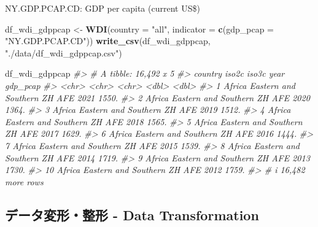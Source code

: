 \documentclass[
  xelatex, ja=standard]{bxjsbook}
\newenvironment{Shaded}{\begin{snugshade}}{\end{snugshade}}
\newcommand{\AttributeTok}[1]{\textcolor[rgb]{0.13,0.29,0.53}{#1}}
\newcommand{\CommentTok}[1]{\textcolor[rgb]{0.56,0.35,0.01}{\textit{#1}}}
\newcommand{\FunctionTok}[1]{\textcolor[rgb]{0.13,0.29,0.53}{\textbf{#1}}}
\newcommand{\NormalTok}[1]{#1}
\newcommand{\OtherTok}[1]{\textcolor[rgb]{0.56,0.35,0.01}{#1}}
\newcommand{\StringTok}[1]{\textcolor[rgb]{0.31,0.60,0.02}{#1}}
\theoremstyle{definition}
\theoremstyle{definition}
\theoremstyle{definition}
\theoremstyle{definition}
\theoremstyle{remark}
\begin{document}
NY.GDP.PCAP.CD: GDP per capita (current US\$)

\begin{Shaded}
\begin{Highlighting}[]
\NormalTok{df\_wdi\_gdppcap }\OtherTok{\textless{}{-}} \FunctionTok{WDI}\NormalTok{(}\AttributeTok{country =} \StringTok{"all"}\NormalTok{, }\AttributeTok{indicator =} \FunctionTok{c}\NormalTok{(}\AttributeTok{gdp\_pcap =} \StringTok{"NY.GDP.PCAP.CD"}\NormalTok{))}
\FunctionTok{write\_csv}\NormalTok{(df\_wdi\_gdppcap, }\StringTok{"./data/df\_wdi\_gdppcap.csv"}\NormalTok{)}
\end{Highlighting}
\end{Shaded}

\begin{Shaded}
\begin{Highlighting}[]
\NormalTok{df\_wdi\_gdppcap}
\CommentTok{\#\textgreater{} \# A tibble: 16,492 x 5}
\CommentTok{\#\textgreater{}    country                     iso2c iso3c  year gdp\_pcap}
\CommentTok{\#\textgreater{}    \textless{}chr\textgreater{}                       \textless{}chr\textgreater{} \textless{}chr\textgreater{} \textless{}dbl\textgreater{}    \textless{}dbl\textgreater{}}
\CommentTok{\#\textgreater{}  1 Africa Eastern and Southern ZH    AFE    2021    1550.}
\CommentTok{\#\textgreater{}  2 Africa Eastern and Southern ZH    AFE    2020    1364.}
\CommentTok{\#\textgreater{}  3 Africa Eastern and Southern ZH    AFE    2019    1512.}
\CommentTok{\#\textgreater{}  4 Africa Eastern and Southern ZH    AFE    2018    1565.}
\CommentTok{\#\textgreater{}  5 Africa Eastern and Southern ZH    AFE    2017    1629.}
\CommentTok{\#\textgreater{}  6 Africa Eastern and Southern ZH    AFE    2016    1444.}
\CommentTok{\#\textgreater{}  7 Africa Eastern and Southern ZH    AFE    2015    1539.}
\CommentTok{\#\textgreater{}  8 Africa Eastern and Southern ZH    AFE    2014    1719.}
\CommentTok{\#\textgreater{}  9 Africa Eastern and Southern ZH    AFE    2013    1730.}
\CommentTok{\#\textgreater{} 10 Africa Eastern and Southern ZH    AFE    2012    1759.}
\CommentTok{\#\textgreater{} \# i 16,482 more rows}
\end{Highlighting}
\end{Shaded}

\hypertarget{ux30c7ux30fcux30bfux5909ux5f62ux6574ux5f62---data-transformation}{%
\subsection{データ変形・整形 - Data Transformation}\label{ux30c7ux30fcux30bfux5909ux5f62ux6574ux5f62---data-transformation}}
\end{document}
